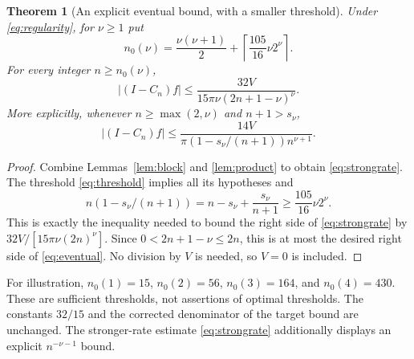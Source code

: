 \documentclass[11pt]{article}
\newtheorem{theorem}{Theorem}[section]
\theoremstyle{remark}\newtheorem{remark}[theorem]{Remark}
\begin{document}
\begin{theorem}[An explicit eventual bound, with a smaller threshold]
\label{thm:threshold}
Under \eqref{eq:regularity}, for $\nu\ge1$ put
\begin{equation}\label{eq:threshold}
 n_0(\nu)=\frac{\nu(\nu+1)}2+
            \left\lceil\frac{105}{16}\nu2^\nu\right\rceil.
\end{equation}
For every integer $n\ge n_0(\nu)$,
\begin{equation}\label{eq:eventual}
 |(I-C_n)f|\le\frac{32V}{15\pi\nu(2n+1-\nu)^\nu}.
\end{equation}
More explicitly, whenever $n\ge\max(2,\nu)$ and $n+1>s_\nu$,
\begin{equation}\label{eq:strongrate}
 |(I-C_n)f|\le
 \frac{14V}{\pi(1-s_\nu/(n+1))n^{\nu+1}}.
\end{equation}
\end{theorem}
\begin{proof}
Combine Lemmas~\ref{lem:block} and \ref{lem:product} to obtain
\eqref{eq:strongrate}. The threshold \eqref{eq:threshold} implies all
its hypotheses and
\[
 n(1-s_\nu/(n+1))=n-s_\nu+\frac{s_\nu}{n+1}
 \ge\frac{105}{16}\nu2^\nu.
\]
This is exactly the inequality needed to bound the right side of
\eqref{eq:strongrate} by $32V/[15\pi\nu(2n)^\nu]$.
Since $0<2n+1-\nu\le2n$, this is at most the desired right side of
\eqref{eq:eventual}. No division by $V$ is needed, so $V=0$ is included.
\end{proof}
For illustration, $n_0(1)=15$, $n_0(2)=56$, $n_0(3)=164$, and
$n_0(4)=430$. These are sufficient thresholds, not assertions of optimal
thresholds. The constants $32/15$ and the corrected denominator of the
target bound are unchanged. The stronger-rate estimate
\eqref{eq:strongrate} additionally displays an explicit $n^{-\nu-1}$
bound.
\end{document}
